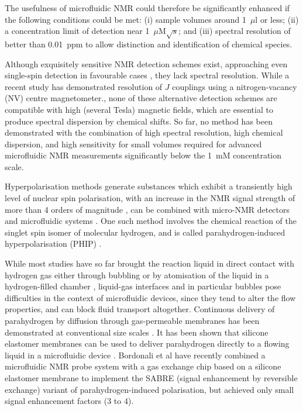 The usefulness of microfluidic NMR could therefore be significantly
enhanced if the following conditions could be met:
(i) sample volumes around 1~$\mu$l or less;
(ii) a concentration limit of
detection near  1~$\mu$M$\sqrt{s}$; and
(iii)  spectral
resolution of better than 0.01~ppm to allow distinction and identification
of chemical species.

Although exquisitely sensitive NMR detection schemes exist,
approaching even single-spin detection in favourable cases
\cite{Rugar:1992dm,Rugar:2004bc,Mamin:2007ff,Poggio:2010jf,
Maze:2008cs,Staudacher:2013kn,Rugar:2015by,McDermott:2002hp,
Budker:2007hz,Xu:2006kg,Blanchard:2013gs}, they lack spectral resolution.
While a recent study
has demonstrated resolution of $J$ couplings using a nitrogen-vacancy
(NV) centre magnetometer.\cite{Glenn:2018ct}, none of these
alternative detection schemes are compatible with high (several Tesla)
magnetic fields, which are essential to produce spectral dispersion
by chemical shifts.
So far, no method has been demonstrated with the combination of high
spectral resolution, high chemical dispersion,
and high sensitivity for small volumes required for
advanced microfluidic NMR measurements significantly
below the 1~mM concentration scale.

Hyperpolarisation methods generate substances which exhibit a transiently high
level of nuclear spin polarisation, with an increase in the NMR signal strength
of more than 4 orders of magnitude \cite{munnemann2011nuclear}, can be combined
with micro-NMR detectors and microfluidic systems \cite{McDonnell:2005dn,Desvaux:2009bq,Telkki:2010vg,Paciok:2011ek,JimenezMartinez:2014et,Causier:2015fg,eills-hale2018EuromarPHIP,Bordonali:2019jqa}.
One such method
involves the chemical reaction of the singlet spin isomer of molecular
hydrogen, and is called parahydrogen-induced hyperpolarisation (PHIP)
\cite{hovener2018parahydrogen,duckett2012application,gloggler2013hydrogen,green2012theory}.

While most studies have so far brought the reaction liquid in direct contact
with hydrogen gas either through bubbling or by atomisation of the liquid
in a hydrogen-filled chamber \cite{bhattacharya2007towards,chekmenev2008pasadena,
chekmenev2009hyperpolarized,shchepin2014parahydrogen,
Reineri:2015he,cavallari201813,eills2017singlet},
liquid-gas interfaces and in particular bubbles
pose difficulties in the context of microfluidic devices, since they tend
to alter the flow properties, and can block fluid transport altogether.
Continuous delivery of parahydrogen by diffusion through
gas-permeable membranes has been demonstrated at
conventional size scales \cite{Roth:2010hk,Lehmkuhl:2018cd}.
It has been shown that silicone elastomer membranes can be used
to deliver parahydrogen directly to a flowing liquid in a microfluidic
device \cite{eills-hale2018EuromarPHIP}. Bordonali et al\cite{Bordonali:2019jqa} have
recently combined a microfluidic NMR probe system with a gas exchange
chip based on a silicone elastomer membrane to implement the SABRE (signal
enhancement by reversible exchange) variant of parahydrogen-induced polarisation,
but achieved only small signal enhancement factors (3 to 4).

